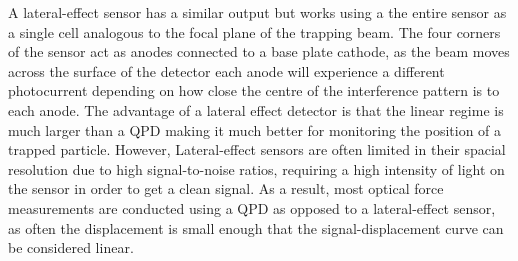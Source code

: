 A lateral-effect sensor has a similar output but works using a the 
entire sensor as a single cell analogous to the focal plane of the 
trapping beam. The four corners of the sensor act as anodes connected 
to a base plate cathode, as the beam moves across the surface of the 
detector each anode will experience a different photocurrent depending 
on how close the centre of the interference pattern is to each anode. 
The advantage of a lateral effect detector is that the linear regime 
is much larger than a QPD making it much better for monitoring the 
position of a trapped particle. However, Lateral-effect sensors are 
often limited in their spacial resolution due to high signal-to-noise 
ratios, requiring a high intensity of light on the sensor in order to 
get a clean signal. As a result, most optical force measurements are 
conducted using a QPD as opposed to a lateral-effect sensor, as often 
the displacement is small enough that the signal-displacement curve 
can be considered linear.

